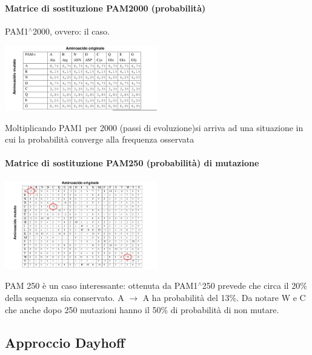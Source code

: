 \documentclass{article}
\begin{document}
\paragraph{Matrice di sostituzione PAM2000 (probabilità)} PAM1$^\wedge$2000, ovvero: il caso.
\begin{center}
    \includegraphics[width=0.5\textwidth]{figures/pam2000.png}\\
\end{center}
Moltiplicando PAM1 per 2000 (passi di
evoluzione)si arriva ad una situazione in cui la
probabilità converge alla frequenza osservata
\paragraph{Matrice di sostituzione PAM250 (probabilità) di mutazione} 
\begin{center}
    \includegraphics[width=0.5\textwidth]{figures/pam250.png}\\
\end{center}
PAM 250 è un caso interessante: ottenuta da PAM1$^\wedge$250 prevede che circa il 20\%
della sequenza sia conservato. A $ \rightarrow$ A ha probabilità del 13\%. Da notare W e C che
anche dopo 250 mutazioni hanno il 50\% di probabilità di non mutare.
\subsection{Approccio Dayhoff}
\end{document}
